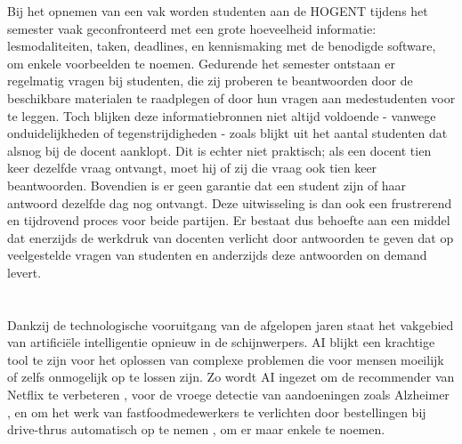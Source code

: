Bij het opnemen van een vak worden studenten aan de HOGENT tijdens het semester vaak geconfronteerd met een grote hoeveelheid informatie: lesmodaliteiten, taken, deadlines, en kennismaking met de benodigde software, om enkele voorbeelden te noemen. Gedurende het semester ontstaan er regelmatig vragen bij studenten, die zij proberen te beantwoorden door de beschikbare materialen te raadplegen of door hun vragen aan medestudenten voor te leggen. Toch blijken deze informatiebronnen niet altijd voldoende - vanwege onduidelijkheden of tegenstrijdigheden - zoals blijkt uit het aantal studenten dat alsnog bij de docent aanklopt. Dit is echter niet praktisch; als een docent tien keer dezelfde vraag ontvangt, moet hij of zij die vraag ook tien keer beantwoorden. Bovendien is er geen garantie dat een student zijn of haar antwoord dezelfde dag nog ontvangt. Deze uitwisseling is dan ook een frustrerend en tijdrovend proces voor beide partijen. Er bestaat dus behoefte aan een middel dat enerzijds de werkdruk van docenten verlicht door antwoorden te geven dat op veelgestelde vragen van studenten en anderzijds deze antwoorden on demand levert. 

\section{}%
\label{sec:onderzoeksvraag}


Dankzij de technologische vooruitgang van de afgelopen jaren staat het vakgebied van artificiële intelligentie opnieuw in de schijnwerpers. \acrfull{AI} blijkt een krachtige tool te zijn voor het oplossen van complexe problemen die voor mensen moeilijk of zelfs onmogelijk op te lossen zijn. Zo wordt \acrshort{AI} ingezet om de \gls{recommender} van Netflix te verbeteren \autocite{Steck2021}, voor de vroege detectie van aandoeningen zoals Alzheimer \autocite{Lewis2024}, en om het werk van fastfoodmedewerkers te verlichten door bestellingen bij drive-thrus automatisch op te nemen \autocite{Kinnear2024}, om er maar enkele te noemen.

